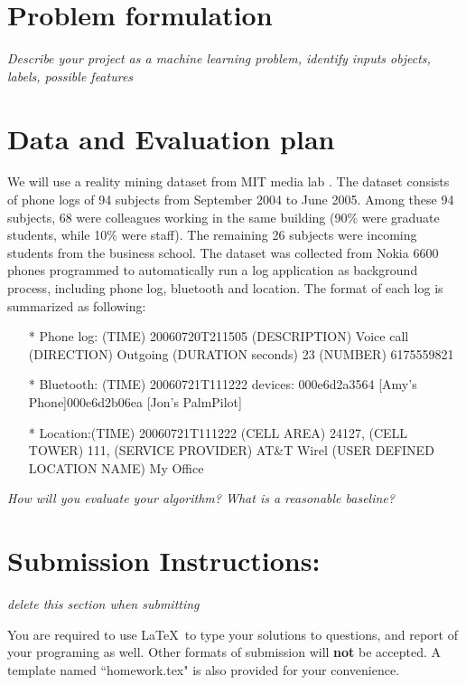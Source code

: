 \documentclass[11pt]{article}
\begin{document}
\section{Problem formulation}
\textit{Describe your project as a machine learning problem, identify inputs objects, labels, possible features}

\section{Data and Evaluation plan} \label{Data and Evaluation plan}
We will use a reality mining dataset from MIT media lab \cite{eagle_inferring_2009}. The dataset consists of phone logs of 94 subjects from September 2004 to June 2005. Among these 94 subjects, 68 were colleagues working in the same building (90\% were graduate students, while 10\% were staff). The remaining 26 subjects were incoming students from the business school. The dataset was collected from Nokia 6600 phones programmed to automatically run a log application as background process, including phone log, bluetooth and location. The format of each log is summarized as following:
\begin{itemize}
\item[*]
Phone log: (TIME)  20060720T211505  (DESCRIPTION)  Voice  call  (DIRECTION)  Outgoing  (DURATION 
seconds) 23 (NUMBER) 6175559821
\item[*]
Bluetooth: (TIME) 20060721T111222 devices: 000e6d2a3564 [Amy’s Phone]000e6d2b06ea [Jon’s PalmPilot] 
\item[*]
Location:(TIME) 20060721T111222 (CELL AREA) 24127, (CELL TOWER) 111, (SERVICE PROVIDER) AT\&T 
Wirel (USER DEFINED LOCATION NAME) My Office
\end{itemize}

\textit{How will you evaluate your algorithm? What is a reasonable baseline?}



\section*{Submission Instructions:} 
\textit{delete this section when submitting}

You are required to use \LaTeX \, to type your solutions to questions, and report of your programing as well. Other formats of submission will \textbf{not} be accepted. A template named ``homework.tex" is also provided for your convenience.\\
\end{document}
